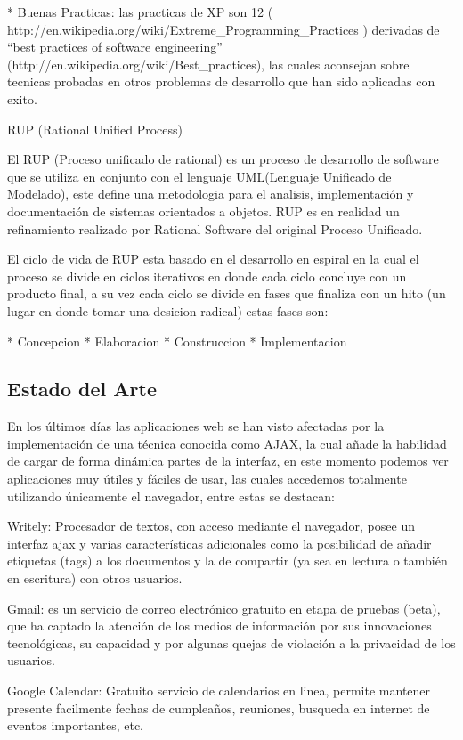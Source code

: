 * Buenas Practicas: las practicas de XP son 12 ( http://en.wikipedia.org/wiki/Extreme\_Programming\_Practices ) derivadas de ``best practices of software engineering'' (http://en.wikipedia.org/wiki/Best\_practices), las cuales aconsejan sobre tecnicas probadas en otros problemas de desarrollo que han sido aplicadas con exito.



RUP (Rational Unified Process)

El RUP (Proceso unificado de rational) es un proceso de desarrollo de software que se utiliza en conjunto con el lenguaje UML(Lenguaje Unificado de Modelado), este define una metodologia para el analisis, implementación y documentación de sistemas orientados a objetos. RUP es en realidad un refinamiento realizado por Rational Software del original Proceso Unificado.

El ciclo de vida de RUP esta basado en el desarrollo en espiral en la cual el proceso se divide en ciclos iterativos en donde cada ciclo concluye con un producto final, a su vez cada ciclo se divide en fases que finaliza con un hito (un lugar en donde tomar una desicion radical) estas fases son: 

* Concepcion
* Elaboracion
* Construccion
* Implementacion

\subsection{Estado del Arte}

En los últimos días las aplicaciones web se han visto afectadas por la implementación de una técnica conocida como AJAX, la cual añade la habilidad de cargar de forma dinámica partes de la interfaz, en este momento podemos ver aplicaciones muy útiles y fáciles de usar, las cuales accedemos totalmente utilizando únicamente el navegador, entre estas se destacan:

Writely: Procesador de textos, con acceso mediante el navegador, posee un interfaz ajax y varias características adicionales como la posibilidad de añadir etiquetas (tags) a los documentos y la de compartir (ya sea en lectura o también en escritura) con otros usuarios.

Gmail: es un servicio de correo electrónico gratuito en etapa de pruebas (beta), que ha captado la atención de los medios de información por sus innovaciones tecnológicas, su capacidad y por algunas quejas de violación a la privacidad de los usuarios.

Google Calendar: Gratuito servicio de calendarios en linea, permite mantener presente facilmente fechas de cumpleaños, reuniones, busqueda en internet de eventos importantes, etc.


